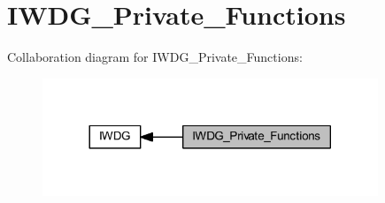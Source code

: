 \hypertarget{group___i_w_d_g___private___functions}{}\section{I\+W\+D\+G\+\_\+\+Private\+\_\+\+Functions}
\label{group___i_w_d_g___private___functions}
Collaboration diagram for I\+W\+D\+G\+\_\+\+Private\+\_\+\+Functions\+:
\nopagebreak
\begin{figure}[H]
\begin{center}
\leavevmode
\includegraphics[width=284pt]{group___i_w_d_g___private___functions}
\end{center}
\end{figure}
